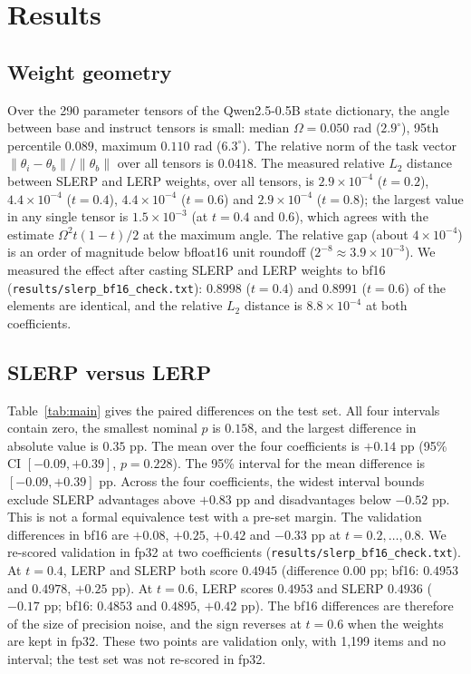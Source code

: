 \documentclass[conference]{IEEEtran}
\begin{document}
\section{Results}
\subsection{Weight geometry}\label{sec:geometry}
Over the 290 parameter tensors of the Qwen2.5-0.5B state dictionary, the angle between base and instruct tensors is small: median $\Omega=0.050$ rad ($2.9^\circ$), 95th percentile $0.089$, maximum $0.110$ rad ($6.3^\circ$). The relative norm of the task vector $\lVert\theta_i-\theta_b\rVert/\lVert\theta_b\rVert$ over all tensors is $0.0418$. The measured relative $L_2$ distance between SLERP and LERP weights, over all tensors, is $2.9\times10^{-4}$ ($t=0.2$), $4.4\times10^{-4}$ ($t=0.4$), $4.4\times10^{-4}$ ($t=0.6$) and $2.9\times10^{-4}$ ($t=0.8$); the largest value in any single tensor is $1.5\times10^{-3}$ (at $t=0.4$ and $0.6$), which agrees with the estimate $\Omega^2 t(1-t)/2$ at the maximum angle. The relative gap (about $4\times10^{-4}$) is an order of magnitude below bfloat16 unit roundoff ($2^{-8}\approx3.9\times10^{-3}$). We measured the effect after casting SLERP and LERP weights to bf16 (\texttt{results/slerp\_bf16\_check.txt}): $0.8998$ ($t=0.4$) and $0.8991$ ($t=0.6$) of the elements are identical, and the relative $L_2$ distance is $8.8\times10^{-4}$ at both coefficients.

\subsection{SLERP versus LERP}
Table~\ref{tab:main} gives the paired differences on the test set. All four intervals contain zero, the smallest nominal $p$ is $0.158$, and the largest difference in absolute value is $0.35$ pp. The mean over the four coefficients is $+0.14$ pp (95\% CI $[-0.09,+0.39]$, $p=0.228$). The 95\% interval for the mean difference is $[-0.09,+0.39]$ pp. Across the four coefficients, the widest interval bounds exclude SLERP advantages above $+0.83$ pp and disadvantages below $-0.52$ pp. This is not a formal equivalence test with a pre-set margin. The validation differences in bf16 are $+0.08$, $+0.25$, $+0.42$ and $-0.33$ pp at $t=0.2,\dots,0.8$. We re-scored validation in fp32 at two coefficients (\texttt{results/slerp\_bf16\_check.txt}). At $t=0.4$, LERP and SLERP both score $0.4945$ (difference $0.00$ pp; bf16: $0.4953$ and $0.4978$, $+0.25$ pp). At $t=0.6$, LERP scores $0.4953$ and SLERP $0.4936$ ($-0.17$ pp; bf16: $0.4853$ and $0.4895$, $+0.42$ pp). The bf16 differences are therefore of the size of precision noise, and the sign reverses at $t=0.6$ when the weights are kept in fp32. These two points are validation only, with 1{,}199 items and no interval; the test set was not re-scored in fp32.
\end{document}
